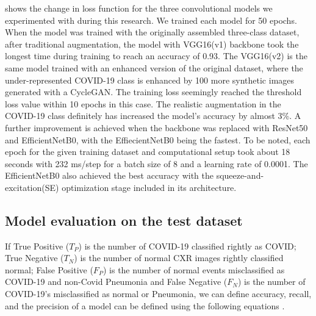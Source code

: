  shows the change in loss function for the three convolutional models we experimented with during this research. We trained each model for 50 epochs. When the model was trained with the originally assembled three-class dataset, after traditional augmentation, the model with VGG16(v1) backbone took the longest time during training to reach an accuracy of 0.93. The VGG16(v2) is the same model trained with an enhanced version of the original dataset, where the under-represented COVID-19 class is enhanced by 100 more synthetic images generated with a CycleGAN. The training loss seemingly reached the threshold loss value within 10 epochs in this case. The realistic augmentation in the COVID-19 class definitely has increased the model's accuracy by almost 3\%. A further improvement is achieved when the backbone was replaced with ResNet50 and EfficientNetB0, with the EffiecientNetB0 being the fastest. To be noted, each epoch for the given training dataset and computational setup took about 18 seconds with 232 ms/step for a batch size of 8 and a learning rate of 0.0001. The EfficientNetB0  also achieved the best accuracy with the squeeze-and-excitation(SE) optimization stage included in its architecture.




\subsection{Model evaluation on the test dataset}

If True Positive ($T_P$) is the number of COVID-19 classified
rightly as COVID; True Negative ($T_N$) is the number of normal
CXR images rightly classified normal; False Positive ($F_P$) is the
number of normal events misclassified as COVID-19 and non-Covid Pneumonia and False
Negative ($F_N$) is the number of COVID-19's misclassified as
normal or Pneumonia, we can define accuracy, recall, and the precision of a model can be defined using the following equations \cite{SOKOLOVA2009}.

